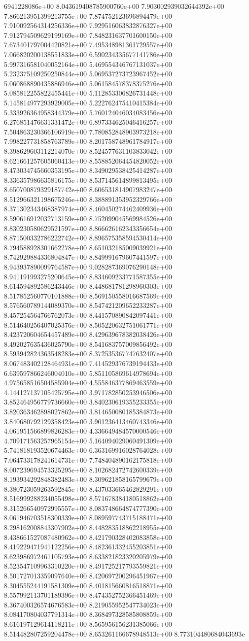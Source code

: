 6941228086e+00	8.043619408785900760e+00	7.903002939032644392e+00	7.866213951399213755e+00	7.874752123696894479e+00	7.910092564314256336e+00	7.929516063832876327e+00	7.912794509629199169e+00	7.848231637701600150e+00	7.673401797004420821e+00	7.495348981361729557e+00	7.066820200138551833e+00	6.590234335677141786e+00	5.997316581040052164e+00	5.469554346767131037e+00	5.232375109250250844e+00	5.069537273723967452e+00	5.060868890435886946e+00	5.061584578378375276e+00	5.085812255822455441e+00	5.112853306826731448e+00	5.145814977293929005e+00	5.222762475410415384e+00	5.333926364958344379e+00	5.760124046034083456e+00	6.276851476631331472e+00	6.897334625046416257e+00	7.504863230366106919e+00	7.780852848903973218e+00	7.998227731858763789e+00	8.201758748961784917e+00	8.398629603112214070e+00	8.524577631103833042e+00	8.621661257605060413e+00	8.558852064454820052e+00	8.473034745660353195e+00	8.349029538425414287e+00	8.336357986635816175e+00	8.537145614899813495e+00	8.650700879329187742e+00	8.606531814907983247e+00	8.512966321198675246e+00	8.388891353952329766e+00	8.371302343468387974e+00	8.460450274462409936e+00	8.590616912032713159e+00	8.752099045569984526e+00	8.830230580629521597e+00	8.866626162343356654e+00	8.871500332786222742e+00	8.896575358594530414e+00	8.794588928301662278e+00	8.651032185009039921e+00	8.742929884336804847e+00	8.849991679607441597e+00	8.943937890099764587e+00	9.028287369076290148e+00	8.941191993275200645e+00	8.834609233771587355e+00	8.614594892586243446e+00	8.448681781298960303e+00	8.517852560770101888e+00	8.569150558016687569e+00	8.576560789144089370e+00	8.547421209652233287e+00	8.457254564766762073e+00	8.441570890842097441e+00	8.514640256407025376e+00	8.505220632751061771e+00	8.423720604654457489e+00	8.429639678382038426e+00	8.492027635436025790e+00	8.541683757009856492e+00	8.593942824363548283e+00	8.372535367747632407e+00	8.067483402128464931e+00	7.414529376739194433e+00	6.639597866246004010e+00	5.851105869614978694e+00	4.975658516504585904e+00	4.555846377869463559e+00	4.144127137105425795e+00	3.971782850253946506e+00	3.852464956779736660e+00	3.840230619355233355e+00	3.820363462898027862e+00	3.814650080185384873e+00	3.840680792129358423e+00	3.901236413460743346e+00	4.061951566899826283e+00	4.336649484570000546e+00	4.709171563257965154e+00	5.164094029060491309e+00	5.741818193520674463e+00	6.363169916028764028e+00	7.064733178241614731e+00	7.748404890162175818e+00	8.007239694573325295e+00	8.102682472742600339e+00	8.193934292848382483e+00	8.309621858165799679e+00	8.380723059263592845e+00	8.437033665462829291e+00	8.516999288234055498e+00	8.571678384180518862e+00	8.315266540972995557e+00	8.083748664874777390e+00	8.061946703518300339e+00	8.089597743715188471e+00	8.298162008843307902e+00	8.448283518862218955e+00	8.438661527087480962e+00	8.421790328402083858e+00	8.419229471941122256e+00	8.482361332455203851e+00	8.623986972461105793e+00	8.633821823320205979e+00	8.523547109963310220e+00	8.491725217793559821e+00	8.501727013359097640e+00	8.420697200296451967e+00	8.304555244191581309e+00	8.401815660816518871e+00	8.557992113701189396e+00	8.474352752366451469e+00	8.367400326574676583e+00	8.219055952547734023e+00	8.084170804037791314e+00	8.368497328585808859e+00	8.616197129614118211e+00	8.565956156231385066e+00	8.514482807259204478e+00	8.653261166678948513e+00	8.773104480684043693e